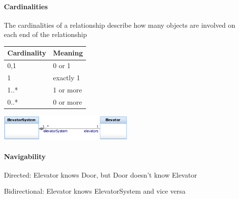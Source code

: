 \paragraph{Cardinalities}
The cardinalities of a relationship describe how many objects are involved on each end of the relationship
\begin{tabular}{ll}\hline
    Cardinality & Meaning   \\\hline
    0,1         & 0 or 1    \\\hline
    1           & exactly 1 \\\hline
    1..*        & 1 or more \\\hline
    0..*        & 0 or more \\\hline
\end{tabular}
\includegraphics[width=0.5\textwidth]{images/UML/cardinality_example.png}

\paragraph{Navigability}\vspace{-12pt}
Directed: Elevator knows Door, but Door doesn't know Elevator

Bidirectional: Elevator knows ElevatorSystem and vice versa

